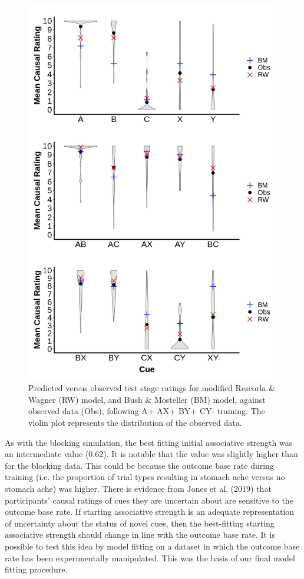 \documentclass[twocolumn]{article}
\begin{document}
\begin{figure}[t!]
\includegraphics[width=\columnwidth]{fig3.jpg}
\caption{Predicted versus observed test stage ratings for modified Rescorla \&
Wagner (RW) model, and Bush \& Mosteller (BM) model, against observed
data (Obs), following A+ AX+ BY+ CY- training. The violin plot
represents the distribution of the observed data.}
\end{figure}

As with the blocking simulation, the best fitting initial associative
strength was an intermediate value (0.62). It is notable that the value
was slightly higher than for the blocking data. This could be because
the outcome base rate during training (i.e. the proportion of trial
types resulting in stomach ache versus no stomach ache) was higher.
There is evidence from Jones et al. (2019) that participants' causal
ratings of cues they are uncertain about are sensitive to the outcome
base rate. If starting associative strength is an adequate
representation of uncertainty about the status of novel cues, then the
best-fitting starting associative strength should change in line with
the outcome base rate. It is possible to test this idea by model fitting
on a dataset in which the outcome base rate has been experimentally
manipulated. This was the basis of our final model fitting procedure.
\end{document}

